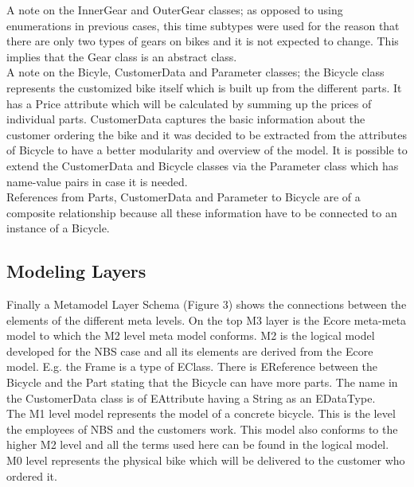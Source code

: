 \noindent A note on the InnerGear and OuterGear classes; as opposed 
to using enumerations in previous cases, this time subtypes were used 
for the reason that there are only two types of gears on bikes and 
it is not expected to change. This implies that the Gear class is an 
abstract class.\\

\noindent A note on the Bicyle, CustomerData and Parameter classes; 
the Bicycle class represents the customized bike itself which is 
built up from the different parts. It has a Price attribute which 
will be calculated by summing up the prices of individual parts. 
CustomerData captures the basic information about the customer 
ordering the bike and it was decided to be extracted from the 
attributes of Bicycle to have a better modularity and overview of 
the model. It is possible to extend the CustomerData and Bicycle 
classes via the Parameter class which has name-value pairs in case 
it is needed.\\

\noindent References from Parts, CustomerData and Parameter to Bicycle 
are of a composite relationship because all these information have to 
be connected to an instance of a Bicycle.\\

\subsection{Modeling Layers}

\noindent Finally a Metamodel Layer Schema (Figure 3) shows the connections
between the elements of the different meta levels. On the top M3 layer is
the Ecore meta-meta model to which the M2 level meta model conforms. 
M2 is the logical model developed for the NBS case and all its elements are
derived from the Ecore model. E.g. the Frame is a type of EClass. There is 
EReference between the Bicycle and the Part stating that the Bicycle can have
more parts. The name in the CustomerData class is of EAttribute having a 
String as an EDataType.\\
The M1 level model represents the model of a concrete bicycle. This is 
the level the employees of NBS and the customers work. This model also
conforms to the higher M2 level and all the terms used here can be found 
in the logical model.\\
M0 level represents the physical bike which will be delivered to the
customer who ordered it. 
